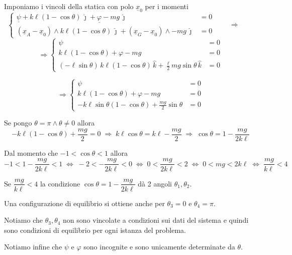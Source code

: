 \begin{example}{}
\begin{figure}
\end{figure}

Imponiamo i vincoli della statica con polo $\underline{x}_0$ per i momenti
\[
\left\{
\begin{aligned}
\underline{\psi} + k\ell(1-\cos\theta)\,\hat{\jmath} + \underline{\varphi} - mg\,\hat{\jmath} &= 0 \\
(\underline{x}_A-\underline{x}_0)\wedge k\ell(1-\cos\theta)\,\hat{\jmath} + (\underline{x}_G-\underline{x}_0)\wedge -mg\,\hat{\jmath} &= 0
\end{aligned}
\right.
\qquad \Rightarrow \qquad
\]
\[
\Rightarrow
\left\{
\begin{aligned}
\psi &= 0 \\
k\ell(1-\cos\theta)+\varphi-mg &= 0 \\
(-\ell\sin\theta)\,k\ell(1-\cos\theta)\,\hat{k} + \frac{\ell}{2}mg\sin\theta\,\hat{k} &= 0
\end{aligned}
\right.
\]

\[
\Rightarrow
\left\{
\begin{aligned}
\psi &= 0 \\
k\ell(1-\cos\theta)+\varphi-mg &= 0 \\
-k\ell\sin\theta(1-\cos\theta)+\frac{mg}{2}\sin\theta &= 0
\end{aligned}
\right.
\]

Se pongo $\theta=\pi \wedge \theta\neq 0$ allora
\[
-k\ell(1-\cos\theta)+\frac{mg}{2}=0
\;\Rightarrow\;
k\ell\cos\theta=k\ell-\frac{mg}{2}
\;\Rightarrow\;
\cos\theta=1-\frac{mg}{2k\ell}
\]

Dal momento che \qquad $-1<\cos\theta<1$ \qquad allora
\[
-1<1-\frac{mg}{2k\ell}<1
\;\Leftrightarrow\;
-2<-\frac{mg}{2k\ell}<0
\;\Leftrightarrow\;
0<\frac{mg}{2k\ell}<2
\;\Leftrightarrow\;
0<mg<2k\ell
\;\Leftrightarrow\;
\frac{mg}{k\ell}<4
\]

Se $\dfrac{mg}{k\ell}<4$ la condizione \qquad $\cos\theta=1-\dfrac{mg}{2k\ell}$ \qquad dà 2 angoli \qquad $\theta_1,\theta_2$.

Una configurazione di equilibrio si ottiene anche per \qquad $\theta_3=0$ \quad e \quad $\theta_4=\pi$.

Notiamo che $\theta_3,\theta_4$ non sono vincolate a condizioni sui dati del sistema e quindi sono condizioni di equilibrio per ogni istanza del problema.

Notiamo infine che $\psi$ e $\varphi$ sono incognite e sono unicamente determinate da $\theta$.
\end{example}

